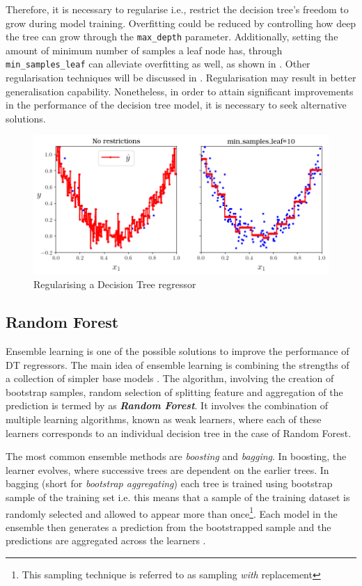 Therefore, it is necessary to regularise i.e., restrict the decision tree's freedom to grow during model training. Overfitting could be reduced by controlling how deep the tree can grow through the {\tt max\_depth} parameter. Additionally, setting the amount of minimum number of samples a leaf node has, through {\tt min\_samples\_leaf} can alleviate overfitting as well, as shown in . Other regularisation techniques will be discussed in . Regularisation may result in better generalisation capability. Nonetheless, in order to attain significant improvements in the performance of the decision tree model, it is necessary to seek alternative solutions.\\

\begin{figure}
    \centering
        \includegraphics[width=.9\textwidth]{02_figures/fig6_6_paramdepth_geron09.png}
        \caption{Regularising a Decision Tree regressor }
        \label{fig:geron6_6}
\end{figure}

\subsection{Random Forest}\label{sec:rf_theo}

Ensemble learning is one of the possible solutions to improve the performance of DT regressors. The main idea of ensemble learning is combining the strengths of a collection of simpler base models . The algorithm, involving the creation of bootstrap samples, random selection of splitting feature and aggregation of the prediction is termed by  as \textbf{\emph{Random Forest}}. It involves the combination of multiple learning algorithms, known as weak learners, where each of these learners corresponds to an individual decision tree in the case of Random Forest.

The most common ensemble methods are \emph{boosting} and \emph{bagging}. In boosting, the learner evolves, where successive trees are dependent on the earlier trees. In bagging (short for \emph{bootstrap aggregating}) each tree is trained using bootstrap sample of the training set i.e. this means that a sample of the training dataset is randomly selected and allowed to appear more than once\footnote{This sampling technique is referred to as sampling \emph{with} replacement}. Each model in the ensemble then generates a prediction from the bootstrapped sample and the predictions are aggregated across the learners .\\

